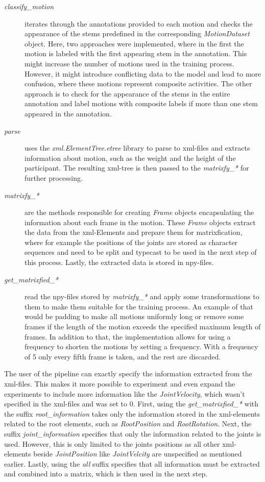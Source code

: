 			\begin{description}
				\item[\textit{classify\_motion}] iterates through the annotations provided to each motion and checks the appearance of the stems predefined in the corresponding \textit{MotionDataset} object. Here, two approaches were implemented, where in the first the motion is labeled with the first appearing stem in the annotation. This might increase the number of motions used in the training process. However, it might introduce conflicting data to the model and lead to more confusion, where these motions represent composite activities. The other approach is to check for the appearance of the stems in the entire annotation and label motions with composite labels if more than one stem appeared in the annotation.
				\item[\textit{parse}] uses the \textit{xml.ElementTree.etree} library to parse to xml-files and extracts information about motion, such as the weight and the height of the participant. The resulting xml-tree is then passed to the \textit{matrixfy\_*} for further processing.
				\item[\textit{matrixfy\_*}] are the methods responsible for creating \textit{Frame} objects encapsulating the information about each frame in the motion. These \textit{Frame} objects extract the data from the xml-Elements and prepare them for matrixfication, where for example the positions of the joints are stored as character sequences and need to be split and typecast to be used in the next step of this process. Lastly, the extracted data is stored in npy-files.
				\item[\textit{get\_matrixfied\_*}] read the npy-files stored by \textit{matrixfy\_*} and apply some transformations to them to make them suitable for the training process. An example of that would be padding to make all motions uniformly long or remove some frames if the length of the motion exceeds the specified maximum length of frames. In addition to that, the implementation allows for using a frequency to shorten the motions by setting a frequency. With a frequency of 5 only every fifth frame is taken, and the rest are discarded.
			\end{description}
			The user of the pipeline can exactly specify the information extracted from the xml-files. This makes it more possible to experiment and even expand the experiments to include more information like the \textit{JointVelocity}, which wasn't specified in the xml-files and was set to 0. First, using the \textit{get\_matrixfied\_*} with the suffix \textit{root\_information} takes only the information stored in the xml-elements related to the root elements, such as \textit{RootPosition} and \textit{RootRotation}. Next, the suffix \textit{joint\_information} specifies that only the information related to the joints is used. However, this is only limited to the joints positions as all other xml-elements beside \textit{JointPosition} like \textit{JointVelcity} are unspecified as mentioned earlier. Lastly, using the \textit{all} suffix specifies that all information must be extracted and combined into a matrix, which is then used in the next step.
